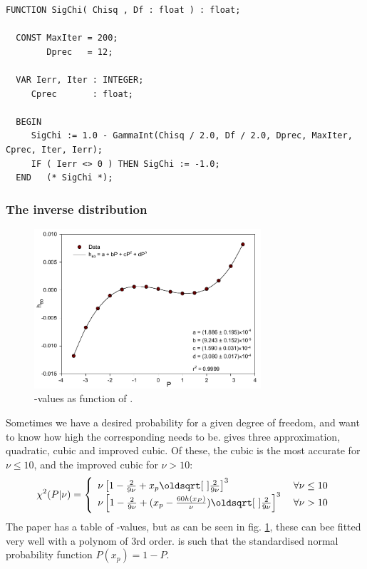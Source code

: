 \begin{refsection}
\begin{lstlisting}[caption=Alternative \( \chi^2 \) integral]
  FUNCTION SigChi( Chisq , Df : float ) : float;

  CONST MaxIter = 200;
        Dprec   = 12;

  VAR Ierr, Iter : INTEGER;
     Cprec       : float;

  BEGIN
     SigChi := 1.0 - GammaInt(Chisq / 2.0, Df / 2.0, Dprec, MaxIter, Cprec, Iter, Ierr);
     IF ( Ierr <> 0 ) THEN SigChi := -1.0;
  END   (* SigChi *);
\end{lstlisting}

\subsubsection{The inverse  distribution}

\begin{figure}
 \caption{\capstart {}-values as function of .  }
 \label{fig:h60}
 \centering
 \includegraphics[width=0.75\textwidth]{Graphics/h60}
\end{figure}

Sometimes we have a desired probability for a given degree of freedom, and want to know how high the corresponding  needs to be. \parencite{Lia-68} gives three approximation, quadratic, cubic and improved cubic. Of these, the cubic is the most accurate for \( \nu \leq 10 \), and the improved cubic for \( \nu > 10 \):
\begin{equation}
  \chi^2(P|\nu) = \left\{
          \begin{array}{l@{\;}l}
             \nu \left[1 - \frac{2}{9 \nu}  + x_p \sqrt{\frac{2}{9 \nu}}\right]^3                           & \quad \forall \nu \leq 10  \\
             \nu \left[1 - \frac{2}{9 \nu} + (x_p - \frac{60 h(x_P)}{\nu}) \sqrt{\frac{2}{9 \nu}}\right]^3  & \quad \forall \nu > 10 \\
          \end{array}
        \right.
\end{equation}
The paper has a table of -values, but as can be seen in fig. \ref{fig:h60}, these can bee fitted very well with a polynom of 3rd order.  is such that the standardised normal probability function \( P(x_p) = 1 - P \).


\end{refsection}
